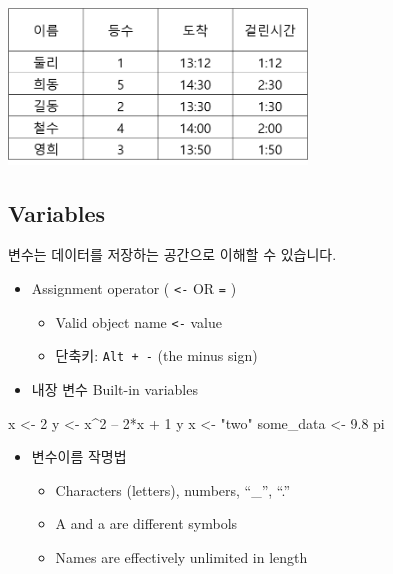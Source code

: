 \documentclass[
  a4paper,
]{book}
\newenvironment{Shaded}{\begin{snugshade}}{\end{snugshade}}
\newcommand{\DecValTok}[1]{\textcolor[rgb]{0.68,0.00,0.00}{#1}}
\newcommand{\FloatTok}[1]{\textcolor[rgb]{0.68,0.00,0.00}{#1}}
\newcommand{\NormalTok}[1]{\textcolor[rgb]{0.00,0.23,0.31}{#1}}
\newcommand{\OtherTok}[1]{\textcolor[rgb]{0.00,0.23,0.31}{#1}}
\newcommand{\SpecialCharTok}[1]{\textcolor[rgb]{0.37,0.37,0.37}{#1}}
\newcommand{\StringTok}[1]{\textcolor[rgb]{0.13,0.47,0.30}{#1}}
\providecommand{\tightlist}{%
  \setlength{\itemsep}{0pt}\setlength{\parskip}{0pt}}\usepackage{longtable,booktabs,array}
\begin{document}
\includegraphics[width=3.125in,height=\textheight]{images/02/01.png}

\hypertarget{variables}{%
\subsection{Variables}\label{variables}}

변수는 데이터를 저장하는 공간으로 이해할 수 있습니다.

\begin{itemize}
\tightlist
\item
  Assignment operator ( \texttt{\textless{}-} OR \texttt{=} )

  \begin{itemize}
  \tightlist
  \item
    Valid object name \texttt{\textless{}-} value
  \item
    단축키: \texttt{Alt\ +\ -} (the minus sign)
  \end{itemize}
\item
  내장 변수 Built-in variables
\end{itemize}

\begin{Shaded}
\begin{Highlighting}[]
\NormalTok{x }\OtherTok{\textless{}{-}} \DecValTok{2}
\NormalTok{y }\OtherTok{\textless{}{-}}\NormalTok{ x}\SpecialCharTok{\^{}}\DecValTok{2}\NormalTok{ – }\DecValTok{2}\SpecialCharTok{*}\NormalTok{x }\SpecialCharTok{+} \DecValTok{1}
\NormalTok{y}
\NormalTok{x }\OtherTok{\textless{}{-}} \StringTok{"two"}  
\NormalTok{some\_data }\OtherTok{\textless{}{-}} \FloatTok{9.8}
\NormalTok{pi}
\end{Highlighting}
\end{Shaded}

\begin{itemize}
\tightlist
\item
  변수이름 작명법

  \begin{itemize}
  \tightlist
  \item
    Characters (letters), numbers, ``\_'', ``.''
  \item
    A and a are different symbols
  \item
    Names are effectively unlimited in length
  \end{itemize}
\end{itemize}
\end{document}
